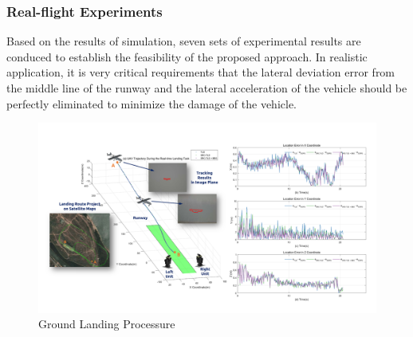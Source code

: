


\subsubsection{Real-flight Experiments}
Based on the results of simulation,  seven sets of experimental results are conduced to establish the feasibility of the proposed approach. In realistic application, it is very critical requirements that the lateral deviation error from the middle line of the runway and the lateral acceleration of the vehicle should be perfectly eliminated to minimize the damage of the vehicle.
\begin{figure}[!th]
	\centering
	\includegraphics[width=\textwidth]{Figs/sci02_landing_results_big.pdf}	
	\caption{Ground Landing Processure}
	\label{fig:sci02_landing_results_big}
\end{figure}


